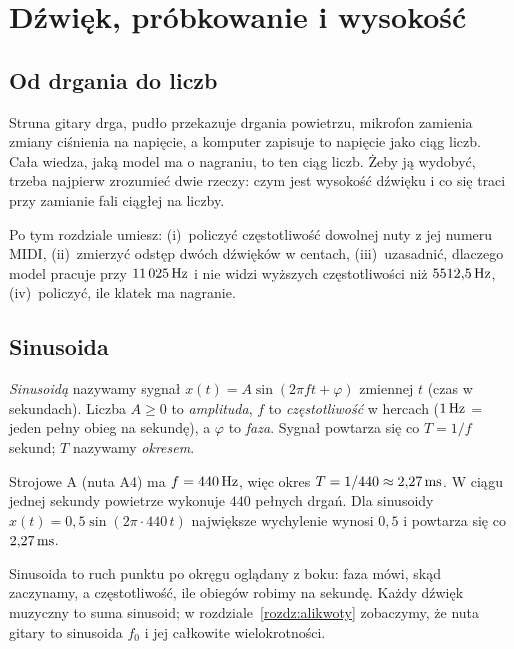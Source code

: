 \chapter{Dźwięk, próbkowanie i wysokość}\label{rozdz:dzwiek}

\section{Od drgania do liczb}

Struna gitary drga, pudło przekazuje drgania powietrzu, mikrofon zamienia zmiany ciśnienia na napięcie,
a komputer zapisuje to napięcie jako ciąg liczb. Cała wiedza, jaką model ma o nagraniu, to ten ciąg liczb.
Żeby ją wydobyć, trzeba najpierw zrozumieć dwie rzeczy: czym jest wysokość dźwięku
i co się traci przy zamianie fali ciągłej na liczby.

Po tym rozdziale umiesz: (i)~policzyć częstotliwość dowolnej nuty z jej numeru MIDI, (ii)~zmierzyć odstęp
dwóch dźwięków w centach, (iii)~uzasadnić, dlaczego model pracuje przy $11\,025\,\mathrm{Hz}$ i nie widzi wyższych częstotliwości
niż $5512{,}5\,\mathrm{Hz}$, (iv)~policzyć, ile klatek ma nagranie.

\section{Sinusoida}

\begin{definicja}\label{def:sinusoida}
\emph{Sinusoidą} nazywamy sygnał $x(t)=A\sin(2\pi f t+\varphi)$ zmiennej $t$ (czas w sekundach). Liczba $A\ge0$ to
\emph{amplituda}, $f$ to \emph{częstotliwość} w hercach ($1\,\mathrm{Hz}$ = jeden pełny obieg na sekundę), a $\varphi$ to
\emph{faza}. Sygnał powtarza się co $T=1/f$ sekund; $T$ nazywamy \emph{okresem}.
\end{definicja}

\begin{przyklad}\label{prz:a4}
Strojowe A (nuta A4) ma $f=440\,\mathrm{Hz}$, więc okres $T=1/440\approx2{,}27\,\mathrm{ms}$. W ciągu jednej sekundy
powietrze wykonuje $440$ pełnych drgań. Dla sinusoidy $x(t)=0{,}5\sin(2\pi\cdot440\,t)$ największe wychylenie
wynosi $0{,}5$ i powtarza się co $2{,}27\,\mathrm{ms}$.
\end{przyklad}

\begin{intuicja}
Sinusoida to ruch punktu po okręgu oglądany z boku: faza mówi, skąd zaczynamy, a częstotliwość, ile obiegów
robimy na sekundę. Każdy dźwięk muzyczny to suma sinusoid; w rozdziale~\ref{rozdz:alikwoty} zobaczymy, że nuta gitary to
sinusoida $f_0$ i jej całkowite wielokrotności.
\end{intuicja}

